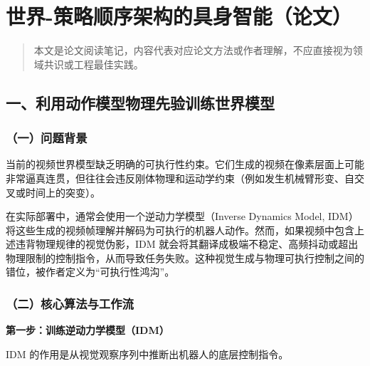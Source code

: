 \clearpage

\hypertarget{ux4e16ux754c-ux7b56ux7565ux987aux5e8fux67b6ux6784ux7684ux5177ux8eabux667aux80fdux8bbaux6587}{%
\section{世界-策略顺序架构的具身智能（论文）}\label{ux4e16ux754c-ux7b56ux7565ux987aux5e8fux67b6ux6784ux7684ux5177ux8eabux667aux80fdux8bbaux6587}}

\begin{quote}
本文是论文阅读笔记，内容代表对应论文方法或作者理解，不应直接视为领域共识或工程最佳实践。
\end{quote}

\hypertarget{ux4e00ux5229ux7528ux52a8ux4f5cux6a21ux578bux7269ux7406ux5148ux9a8cux8badux7ec3ux4e16ux754cux6a21ux578b}{%
\subsection{一、利用动作模型物理先验训练世界模型}\label{ux4e00ux5229ux7528ux52a8ux4f5cux6a21ux578bux7269ux7406ux5148ux9a8cux8badux7ec3ux4e16ux754cux6a21ux578b}}

\hypertarget{ux4e00ux95eeux9898ux80ccux666f-20}{%
\subsubsection{（一）问题背景}\label{ux4e00ux95eeux9898ux80ccux666f-20}}

当前的视频世界模型缺乏明确的可执行性约束。它们生成的视频在像素层面上可能非常逼真连贯，但往往会违反刚体物理和运动学约束（例如发生机械臂形变、自交叉或时间上的突变）。

在实际部署中，通常会使用一个逆动力学模型（Inverse Dynamics Model, IDM）将这些生成的视频帧理解并解码为可执行的机器人动作。然而，如果视频中包含上述违背物理规律的视觉伪影，IDM 就会将其翻译成极端不稳定、高频抖动或超出物理限制的控制指令，从而导致任务失败。这种视觉生成与物理可执行控制之间的错位，被作者定义为``可执行性鸿沟''。

\hypertarget{ux4e8cux6838ux5fc3ux7b97ux6cd5ux4e0eux5de5ux4f5cux6d41-2}{%
\subsubsection{（二）核心算法与工作流}\label{ux4e8cux6838ux5fc3ux7b97ux6cd5ux4e0eux5de5ux4f5cux6d41-2}}

\textbf{第一步：训练逆动力学模型（IDM）}

IDM 的作用是从视觉观察序列中推断出机器人的底层控制指令。

